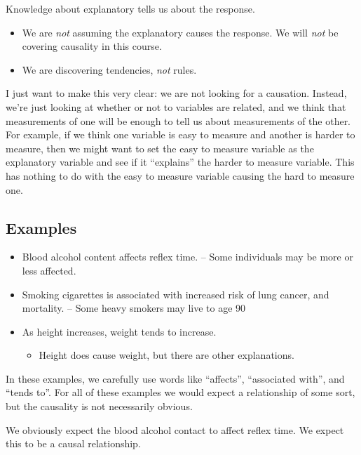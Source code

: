\documentclass[
  letterpaper,
  DIV=11,
  numbers=noendperiod]{scrreprt}
\providecommand{\tightlist}{%
  \setlength{\itemsep}{0pt}\setlength{\parskip}{0pt}}\usepackage{longtable,booktabs,array}
\def\pause{}
\begin{document}
Knowledge about explanatory tells us about the response.

\pause

\begin{itemize}
\tightlist
\item
  We are \emph{not} assuming the explanatory causes the response. We
  will \emph{not} be covering causality in this course.
\item
  We are discovering tendencies, \emph{not} rules.
\end{itemize}

I just want to make this very clear: we are not looking for a causation.
Instead, we're just looking at whether or not to variables are related,
and we think that measurements of one will be enough to tell us about
measurements of the other. For example, if we think one variable is easy
to measure and another is harder to measure, then we might want to set
the easy to measure variable as the explanatory variable and see if it
``explains'' the harder to measure variable. This has nothing to do with
the easy to measure variable causing the hard to measure one.

\hypertarget{examples}{%
\subsection{Examples}\label{examples}}

\begin{itemize}
\tightlist
\item
  Blood alcohol content affects reflex time. -- Some individuals may be
  more or less affected.
\item
  Smoking cigarettes is associated with increased risk of lung cancer,
  and mortality. -- Some heavy smokers may live to age 90
\item
  As height increases, weight tends to increase.

  \begin{itemize}
  \tightlist
  \item
    Height does cause weight, but there are other explanations.
  \end{itemize}
\end{itemize}

In these examples, we carefully use words like ``affects'', ``associated
with'', and ``tends to''. For all of these examples we would expect a
relationship of some sort, but the causality is not necessarily obvious.

We obviously expect the blood alcohol contact to affect reflex time. We
expect this to be a causal relationship.
\end{document}
